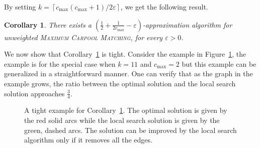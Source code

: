 \documentclass[11pt]{article}
\newtheorem{corollary}{Corollary}
\newcommand{\ceil}[1]{\left\lceil #1 \right\rceil}
\newcommand{\half}{\frac{1}{2}}
\newcommand{\inv}[1]{\frac{1}{#1}}
\newcommand{\carpool}{\textsc{Maximum Carpool Matching}\xspace}
\newcommand{\cmax}{c_{\max}}
\newcommand{\eps}{\varepsilon}
\begin{document}
By setting $k = \ceil{\cmax(\cmax+1)/2\eps}$, we get the following
result.

\begin{corollary}
\label{cor:local}
There exists a $(\half + \inv{2\cmax} - \eps)$-approximation algorithm
for unweighted \carpool, for every $\eps>0$.
\end{corollary}


We now show that Corollary~\ref{cor:local} is tight.  Consider the
example in Figure~\ref{fig:local search tight}, the example is for the
special case when $k = 11$ and $\cmax = 2$ but this example can be
generalized in a straightforward manner.  One can verify that as the
graph in the example grows, the ratio between the optimal solution
and the local search solution approaches $\frac{3}{4}$.

\begin{figure}[t]
\begin{center}
\caption{A tight example for Corollary~\ref{cor:local}. 
The optimal solution is given by the red solid arcs while the local
search solution is given by the green, dashed arcs.  The solution can
be improved by the local search algorithm only if it removes all the
edges.}
\label{fig:local search tight}
\end{center}
\end{figure}
\end{document}
